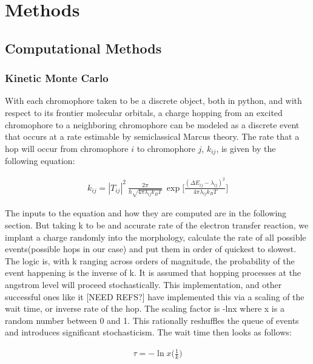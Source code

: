 \chapter{Methods}
\label{chap:methods}


\section{Computational Methods}

\subsection{Kinetic Monte Carlo}

With each chromophore taken to be a discrete object, both in python, and with respect to its frontier
molecular orbitals, a charge hopping from an excited chromophore to a neighboring chromophore can be modeled
as a discrete event that occurs at a rate estimable by semiclassical Marcus theory. The rate that a hop will
occur from chromophore $i$ to chromophore $j$, $k_{ij}$, is given by the
following equation:

\begin{align}
    k_{ij}  =  |T_{ij}|^2\ \frac{2\pi}{\hbar \sqrt{4 \pi \lambda_{ij} k_{B} T}}\ \exp{\Bigg[ \frac{(\Delta
    E_{ij} - \lambda_{ij})^2}{ 4 \pi \lambda_{ij} k_{B} T} \Bigg] }
\end{align}

The inputs to the equation and how they are computed are in the following section. But taking k to be and
accurate rate of the electron transfer reaction, we implant a charge randomly into the morphology, calculate
the rate of all possible events(possible hops in our case)
and put them in order of quickest to slowest. The logic is, with k ranging across orders of magnitude, the
probability of the event happening is the inverse of k. It is assumed that hopping processes at the angstrom level
will proceed stochastically. This implementation, and other successful ones like it [NEED REFS?] have
implemented this via a scaling of the wait time, or inverse rate of the hop. The scaling factor is -lnx where
x is a random number between 0 and 1. This rationally reshuffles the queue of events and introduces
significant stochasticism. The wait time then looks as follows:

\begin{align}
    \tau =  -\ln{x}  \bigg( \frac{1}{k} \bigg)
\end{align}



